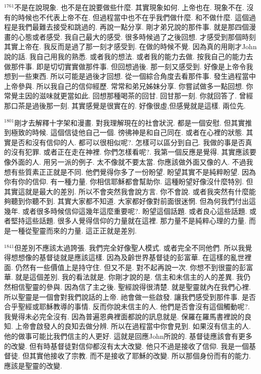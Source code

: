 \documentclass{book}
\begin{document}
$^{1761}$不是在說現象.
也不是在說要做些什麼.
其實現象如何.
上帝也在.
現象不在.
沒有的時候也不代表上帝不在.
但過程當中也不在乎我們做什麼.
和不做什麼.
這個過程是我們最難去接受和跳過的.
再說一點分享.
剛才弟兄說的那件事.
就是那四個漫畫的心態或者感受.
我自己最大的感受.
很多時候過了之後回想.
才感受到那個時刻其實上帝在.
我反而是過了那一刻才感受到.
在做的時候不覺.
因為真的用剛才John說的話.
我自己用我的熟悉.
或者我的想法.
或者我的能力去做.
按我自己的能力去做那件事.
即是切切實實做那件事.
但回想過後.
那一刻又感受到.
好像是上帝令我想到一些東西.
所以可能是過後才回想.
從一個綜合角度去看那件事.
發生過程當中上帝參與.
所以我自己的信仰經歷.
常常和弟兄姊妹分享.
你嘗試做多一點回想.
你常覺主因的滋味就更當如此.
回想那種喝茶的回甘.
回甘那一刻.
你就回答了.
曾經那口茶是過後那一刻.
其實感覺是很實在的.
好像很虛,但感覺就是這樣.
兩位先.

$^{1801}$剛才去解釋十字架和漫畫.
對我理解現在的社會狀況.
都是一個安慰.
但其實推到極致的時候.
這個信徒他自己一個.
徬彿神是和自己同在.
或者在心裡的狀態.
其實是否和沒有信仰的人.
都可以很相似呢?.
怎樣可以區分到自己.
我做的事是否真的沒有犯罪.
或者正在走在神裡.
你們怎樣看呢?.
我第一個反應是覺得.
其實應該要像外面的人.
用另一派的例子.
太不像就不要太當.
你應該做外面又像的人.
不過我想有些質素正正就是不同.
他們覺得你多了一份盼望.
盼望其實不是純粹盼望.
因為你有你的信仰.
有一種力量.
你相信耶穌都會幫助你.
這種盼望好像沒什麼特別.
但其實這就是最大的差別.
所以不會突然我會說方言.
你不會說.
或者我突然有什麼能夠聽到你聽不到.
其實大家都不知道.
大家都好像對前面很迷惘.
但為何我們付出這幾年.
或者很多時候信仰這幾年這麼重要呢?.
盼望這個話題.
或者良心這些話題.
或者堅持這些話題.
很多人覺得信仰的力量就在這裡.
那力量不是純粹心理的力量.
而是一種從聖靈而來的力量.
這正正就是差別.

$^{1841}$但差別不應該太過誇張.
我們完全好像聖人模式.
或者完全不同他們.
所以我覺得想想像的基督徒就是應該這樣.
因為及齡世界基督徒的彭富華.
在這樣的亂世裡面.
仍然有一些價值上是持守住.
但又不是.
對不起再說一次.
你想不到很靈的彭富華.
就是這個差別.
我的看法就是.
你剛才說的是.
信主和未信主的人的差異.
我仍然相信聖靈的參與.
因為信了主之後.
聖經說得很清楚.
就是聖靈就內在我們心裡.
所以聖靈是一個會對我們說話的上帝.
祂會做一些啟發.
讓我們感受到那件事.
是否合乎聖經或耶穌教導的事情.
反而你說未信主的人.
他們是否會沒有這個觸動呢?.
我覺得未必完全沒有.
因為普遍恩典裡面都說的訊息就是.
保羅在羅馬書裡說的良知.
上帝會啟發人的良知去做分辨.
所以在過程當中你會見到.
如果沒有信主的人.
他的做事可能比我們信主的人更好.
這就是回應John所說的.
基督徒應該會有更多的改變.
但有時基督徒對信仰都沒有太大改變.
他只不過是接收了信仰.
我是一個基督徒.
但其實他接收了宗教.
而不是接收了耶穌的改變.
所以那個身份而有的能力.
應該是聖靈的改變.
\end{document}
